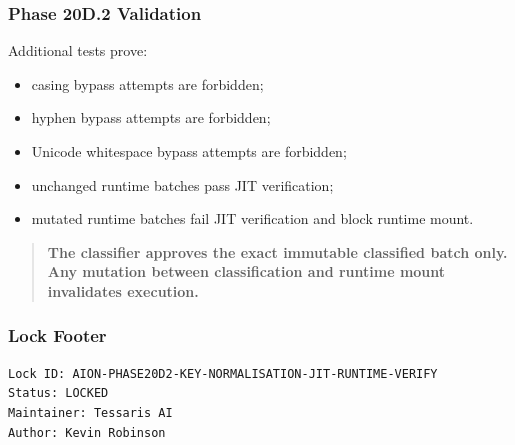 \subsubsection{Phase 20D.2 Validation}

Additional tests prove:

\begin{itemize}
  \item casing bypass attempts are forbidden;
  \item hyphen bypass attempts are forbidden;
  \item Unicode whitespace bypass attempts are forbidden;
  \item unchanged runtime batches pass JIT verification;
  \item mutated runtime batches fail JIT verification and block runtime mount.
\end{itemize}

\begin{quote}
\textbf{The classifier approves the exact immutable classified batch only. Any mutation between classification and runtime mount invalidates execution.}
\end{quote}

\subsubsection{Lock Footer}

\begin{verbatim}
Lock ID: AION-PHASE20D2-KEY-NORMALISATION-JIT-RUNTIME-VERIFY
Status: LOCKED
Maintainer: Tessaris AI
Author: Kevin Robinson
\end{verbatim}
